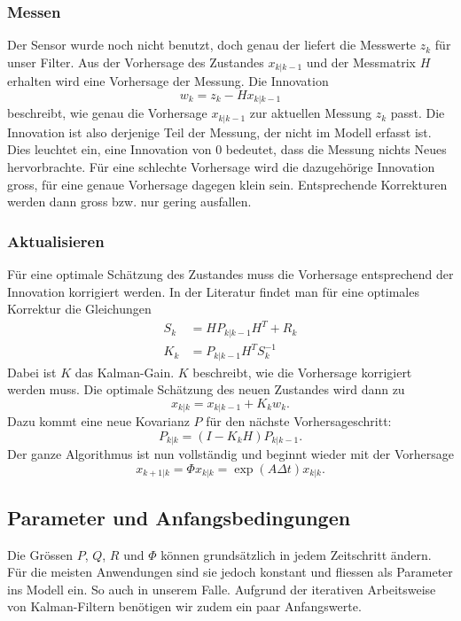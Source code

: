 \subsubsection*{Messen}
Der Sensor wurde noch nicht benutzt, doch genau der liefert die Messwerte $z_k$ für unser Filter. 
%
Aus der Vorhersage des Zustandes $x_{k|k-1}$ und der Messmatrix $H$ erhalten wird eine Vorhersage der Messung. 
%
Die Innovation
%
\[
{w_{k}}={z_{k}}-{H}{x_{k|k-1}}
\] 
beschreibt, wie genau die Vorhersage $x_{k|k-1}$ zur aktuellen Messung $z_k$ passt. 
Die Innovation ist also derjenige Teil der Messung, der nicht im Modell erfasst ist.
Dies leuchtet ein, eine Innovation von $0$ bedeutet, dass die Messung nichts Neues hervorbrachte.
Für eine schlechte Vorhersage wird die dazugehörige Innovation gross, für eine genaue Vorhersage dagegen klein sein. 
Entsprechende Korrekturen werden dann gross bzw. nur gering ausfallen. 

\subsubsection*{Aktualisieren}

Für eine optimale Schätzung des Zustandes muss die Vorhersage entsprechend der Innovation korrigiert werden.
%
In der Literatur findet man für eine optimales Korrektur die Gleichungen
\begin{align*}
{S_{k}} &={H}{P_{k|k-1}}{H}^T+{R_{k}}
\\
{K_{k}} &= {P_{k|k-1}} {H^T}{S_{k}^{-1}}
\end{align*}
Dabei ist $K$ das Kalman-Gain.
%
$K$ beschreibt, wie die Vorhersage korrigiert werden muss.
Die optimale Schätzung des neuen Zustandes wird dann zu
\[
{x_{k|k}}={x_{k|k-1}}+{K_{k}}{w_{k}}.
\] 
Dazu kommt eine neue Kovarianz $P$ für den nächste Vorhersageschritt:
\[
{P_{k|k}}=(I-{K_{k}}{H}){P_{k|k-1}}. 
\] 
Der ganze Algorithmus ist nun vollständig und beginnt wieder mit der Vorhersage 
\[
{x_{k+1|k}}=\Phi{x_{k|k}}= \exp(A\Delta t){x_{k|k}}.
\] 


\subsection{Parameter und Anfangsbedingungen}
Die Grössen $P$, $Q$, $R$ und $\Phi$ können grundsätzlich in jedem Zeitschritt ändern.
Für die meisten Anwendungen sind sie jedoch konstant und fliessen als Parameter ins Modell ein.
So auch in unserem Falle.
Aufgrund der iterativen Arbeitsweise von Kalman-Filtern benötigen wir zudem ein paar Anfangswerte.

